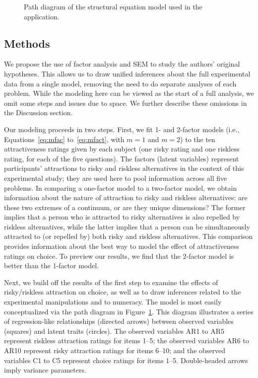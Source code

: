 \begin{figure}[p]
    \centering
    
    \caption{Path diagram of the structural equation model used in the application.} \label{fig:em1:path}
\end{figure}

\subsection{Methods}
 We propose the use of factor analysis and SEM to study the authors' original hypotheses.  This allows us to draw unified inferences about the full experimental data from a single model, removing the need to do separate analyses of each problem.  While the modeling here can be viewed as the start of a full analysis, we omit some steps and issues due to space.  We further describe these omissions in the Discussion section.

Our modeling proceeds in two steps.  First, we fit 1- and 2-factor models (i.e., Equations~\eqref{eq:mfac} to~\eqref{eq:mfact}, with $m=1$ and $m=2$) to the ten attractiveness ratings given by each subject (one risky rating and one riskless rating, for each of the five questions).   The factors (latent variables) represent participants' attractions to risky and riskless alternatives in the context of this experimental study; they are used here to pool information across all five problems. In comparing a one-factor model to a two-factor model, we obtain information  about the nature of attraction to risky and riskless alternatives: are these two extremes of a continuum, or are they unique dimensions?  The former implies that a person who is attracted to risky alternatives is also repelled by riskless alternatives, while the latter implies that a person can be simultaneously attracted to (or repelled by) both risky and riskless alternatives.  This comparison provides information about the best way to model the effect of attractiveness ratings on choice.  To preview our results, we find that the 2-factor model is better than the 1-factor model.

 Next, we build off the results of the first step to examine the effects of risky/riskless attraction on choice, as well as to draw inferences related to the experimental manipulations and to numeracy. The model is most easily conceptualized via the path diagram in Figure~\ref{fig:em1:path}.  This diagram illustrates a series of regression-like relationships (directed arrows) between observed variables (squares) and latent traits (circles).  The observed variables AR1 to AR5 represent riskless attraction ratings for items 1--5; the observed variables AR6 to AR10 represent risky attraction ratings for items 6--10; and the observed variables C1 to C5 represent choice ratings for items 1--5.  Double-headed arrows imply variance parameters.

